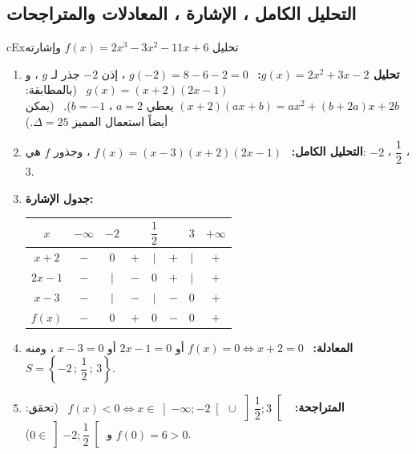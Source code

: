 \documentclass[12pt,a4paper]{article}
\begin{document}
\subsection{التحليل الكامل ، الإشارة ، المعادلات والمتراجحات}
\begin{otherlanguage}{english}\begin{arbox}[breakable]{cEx}{تحليل $f(x)=2x^3-3x^2-11x+6$ وإشارته}
\begin{enumerate}
\item \textbf{تحليل $g(x)=2x^2+3x-2$:} \ $g(-2)=8-6-2=0$ ، إذن $-2$ جذر لـ $g$ ، و $g(x)=(x+2)(2x-1)$ \ (بالمطابقة: $(x+2)(ax+b)=ax^2+(b+2a)x+2b$ يعطي $a=2$ ، $b=-1$). \ (يمكن أيضاً استعمال المميز $\Delta=25$.)
\item \textbf{التحليل الكامل:} \ $\boxed{f(x)=(x-3)(x+2)(2x-1)}$ ، وجذور $f$ هي: $-2$ ، $\dfrac12$ ، $3$.
\item \textbf{جدول الإشارة:}
\begin{center}
\renewcommand{\arraystretch}{1.4}
\begin{tabular}{|C|C|C|C|C|C|C|C|}\hline
{}$x$ & $-\infty$ \quad & $-2$ & & $\dfrac12$ & & $3$ & \quad $+\infty$\\\hline
$x+2$ & $-$ & $0$ & $+$ & $\vert$ & $+$ & $\vert$ & $+$\\\hline
$2x-1$ & $-$ & $\vert$ & $-$ & $0$ & $+$ & $\vert$ & $+$\\\hline
$x-3$ & $-$ & $\vert$ & $-$ & $\vert$ & $-$ & $0$ & $+$\\\hline
$f(x)$ & $-$ & $0$ & $+$ & $0$ & $-$ & $0$ & $+$\\\hline
\end{tabular}
\end{center}
\item \textbf{المعادلة:} \ $f(x)=0\iff x+2=0$ أو $2x-1=0$ أو $x-3=0$ ، ومنه $S=\left\{-2\,;\,\dfrac12\,;\,3\right\}$.
\item \textbf{المتراجحة:} \ $f(x)<0\iff x\in\boxed{\left]-\infty;-2\right[\,\cup\,\left]\dfrac12;3\right[}$ \ (تحقق: $f(0)=6>0$ و $0\in\left]-2;\dfrac12\right[$).
\end{enumerate}
\end{arbox}\end{otherlanguage}
\end{document}
